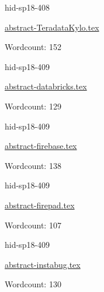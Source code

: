 

\begin{IU}

hid-sp18-408

\href{https://github.com/cloudmesh-community/hid-sp18-408/blob/master//technology/abstract-TeradataKylo.tex}{abstract-TeradataKylo.tex}

 

Wordcount: 152

\end{IU}



\begin{IU}

hid-sp18-409

\href{https://github.com/cloudmesh-community/hid-sp18-409/blob/master//technology/abstract-databricks.tex}{abstract-databricks.tex}

 

Wordcount: 129

\end{IU}



\begin{IU}

hid-sp18-409

\href{https://github.com/cloudmesh-community/hid-sp18-409/blob/master//technology/abstract-firebase.tex}{abstract-firebase.tex}

 

Wordcount: 138

\end{IU}



\begin{IU}

hid-sp18-409

\href{https://github.com/cloudmesh-community/hid-sp18-409/blob/master//technology/abstract-firepad.tex}{abstract-firepad.tex}

 

Wordcount: 107

\end{IU}



\begin{IU}

hid-sp18-409

\href{https://github.com/cloudmesh-community/hid-sp18-409/blob/master//technology/abstract-instabug.tex}{abstract-instabug.tex}

 

Wordcount: 130

\end{IU}

